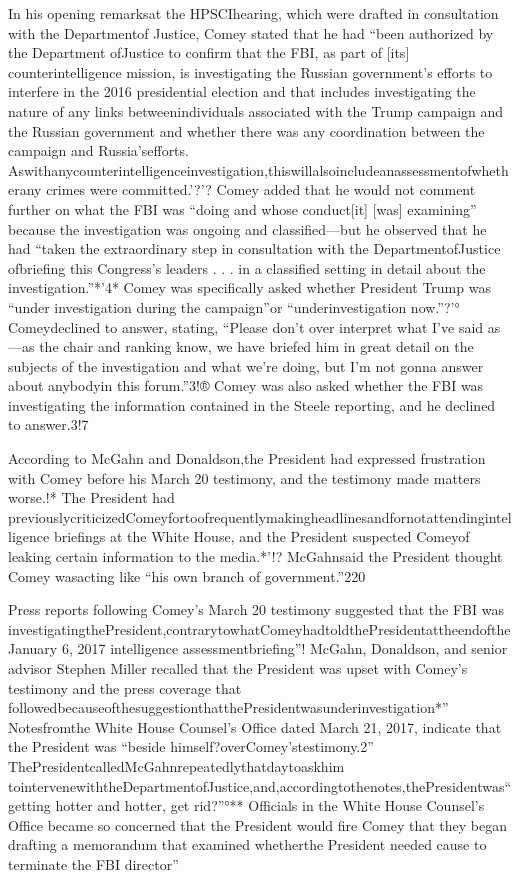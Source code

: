 In his opening remarksat the HPSCIhearing, which were drafted in consultation with the Departmentof Justice, Comey stated that he had “been authorized by the Department ofJustice to confirm that the FBI, as part of [its] counterintelligence mission, is investigating the Russian government’s efforts to interfere in the 2016 presidential election and that includes investigating the nature of any links betweenindividuals associated with the Trump campaign and the Russian government and whether there was any coordination between the campaign and Russia’sefforts. Aswithanycounterintelligenceinvestigation,thiswillalsoincludeanassessmentofwhetherany crimes were committed.’?'? Comey added that he would not comment further on what the FBI was “doing and whose conduct[it] [was] examining” because the investigation was ongoing and classified—but he observed that he had “taken the extraordinary step in consultation with the DepartmentofJustice ofbriefing this Congress’s leaders . . . in a classified setting in detail about the investigation.”*'4* Comey was specifically asked whether President Trump was “under
investigation during the campaign”or “underinvestigation now.”?'° Comeydeclined to answer, stating, “Please don’t over interpret what I’ve said as—as the chair and ranking know, we have briefed him in great detail on the subjects of the investigation and what we’re doing, but I’m not gonna answer about anybodyin this forum.”3!® Comey was also asked whether the FBI was investigating the information contained in the Steele reporting, and he declined to answer.3!7

According to McGahn and Donaldson,the President had expressed frustration with Comey before his March 20 testimony, and the testimony made matters worse.!* The President had previouslycriticizedComeyfortoofrequentlymakingheadlinesandfornotattendingintelligence briefings at the White House, and the President suspected Comeyof leaking certain information to the media.*'!? McGahnsaid the President thought Comey wasacting like “his own branch of government.”220

Press reports following Comey’s March 20 testimony suggested that the FBI was investigatingthePresident,contrarytowhatComeyhadtoldthePresidentattheendoftheJanuary 6, 2017 intelligence assessmentbriefing”! McGahn, Donaldson, and senior advisor Stephen Miller recalled that the President was upset with Comey’s testimony and the press coverage that followedbecauseofthesuggestionthatthePresidentwasunderinvestigation*” Notesfromthe White House Counsel’s Office dated March 21, 2017, indicate that the President was “beside himself?overComey’stestimony.2” ThePresidentcalledMcGahnrepeatedlythatdaytoaskhim tointervenewiththeDepartmentofJustice,and,accordingtothenotes,thePresidentwas“getting hotter and hotter, get rid?”°** Officials in the White House Counsel’s Office became so concerned that the President would fire Comey that they began drafting a memorandum that examined whetherthe President needed cause to terminate the FBI director”


